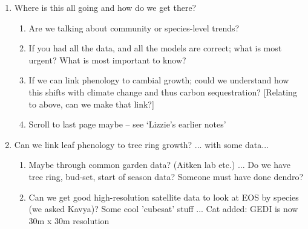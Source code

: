\documentclass[11pt,letter]{article}
\begin{document}
\begin{enumerate}
\item Where is this all going and how do we get there? 
\begin{enumerate}
\item Are we talking about community or species-level trends?
\item If you had all the data, and all the models are correct; what is most urgent? What is most important to know? 
\item If we can link phenology to cambial growth; could we understand how this shifts with climate change and thus carbon sequestration? [Relating to above, can we make that link?]
\item Scroll to last page maybe -- see `Lizzie’s earlier notes'
\end{enumerate}
\item Can we link leaf phenology to tree ring growth? ... with some data... 
\begin{enumerate}
\item Maybe through common garden data? (Aitken lab etc.) ... Do we have tree ring, bud-set, start of season data? Someone must have done dendro?
\item Can we get good high-resolution satellite data to look at EOS by species (we asked Kavya)? Some cool 'cubesat' stuff ... Cat added: GEDI is now 30m x 30m resolution %
\end{enumerate}
\end{enumerate}
\end{document}

